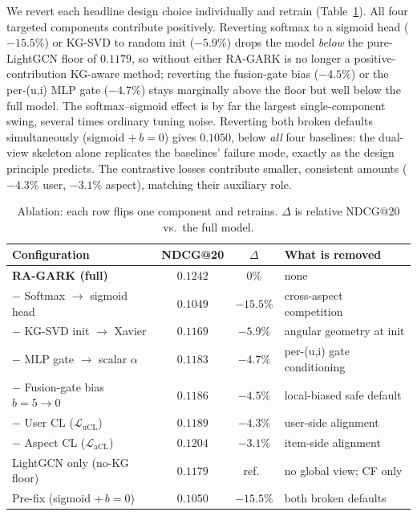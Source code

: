 \documentclass[12pt,a4paper]{article}
\begin{document}
We revert each headline design choice individually and retrain (Table~\ref{tab:abl}). All four targeted components contribute positively. Reverting softmax to a sigmoid head ($-15.5\%$) or KG-SVD to random init ($-5.9\%$) drops the model \emph{below} the pure-LightGCN floor of $0.1179$, so without either RA-GARK is no longer a positive-contribution KG-aware method; reverting the fusion-gate bias ($-4.5\%$) or the per-(u,i) MLP gate ($-4.7\%$) stays marginally above the floor but well below the full model. The softmax--sigmoid effect is by far the largest single-component swing, several times ordinary tuning noise. Reverting both broken defaults simultaneously (sigmoid $+\,b{=}0$) gives $0.1050$, below \emph{all} four baselines: the dual-view skeleton alone replicates the baselines' failure mode, exactly as the design principle predicts. The contrastive losses contribute smaller, consistent amounts ($-4.3\%$ user, $-3.1\%$ aspect), matching their auxiliary role.

\begin{table}[!ht]
\centering
\caption{Ablation: each row flips one component and retrains. $\Delta$ is relative NDCG@20 vs.\ the full model.}
\label{tab:abl}
\small
\begin{tabular}{lccl}
\toprule
Configuration & NDCG@20 & $\Delta$ & What is removed \\
\midrule
\textbf{RA-GARK (full)} & $\mathbf{0.1242}$ & $0\%$ & none \\
\midrule
$-$ Softmax $\to$ sigmoid head     & $0.1049$ & $-15.5\%$ & cross-aspect competition \\
$-$ KG-SVD init $\to$ Xavier       & $0.1169$ & $-5.9\%$  & angular geometry at init \\
$-$ MLP gate $\to$ scalar $\alpha$ & $0.1183$ & $-4.7\%$  & per-(u,i) gate conditioning \\
$-$ Fusion-gate bias $b{=}5\to0$   & $0.1186$ & $-4.5\%$  & local-biased safe default \\
$-$ User CL ($\mathcal{L}_{\mathrm{uCL}}$)   & $0.1189$ & $-4.3\%$ & user-side alignment \\
$-$ Aspect CL ($\mathcal{L}_{\mathrm{aCL}}$) & $0.1204$ & $-3.1\%$ & item-side alignment \\
\midrule
LightGCN only (no-KG floor)        & $0.1179$ & ref.\ & no global view; CF only \\
Pre-fix (sigmoid $+\,b{=}0$)       & $0.1050$ & $-15.5\%$ & both broken defaults \\
\bottomrule
\end{tabular}
\end{table}
\end{document}
